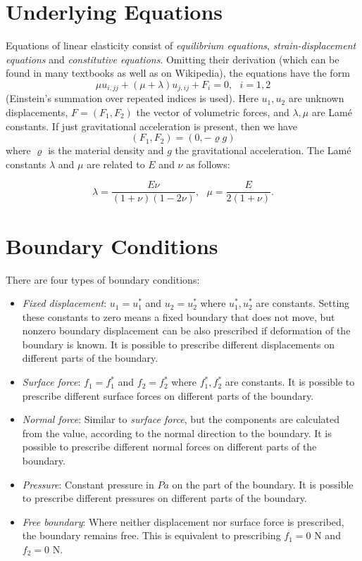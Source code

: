 \documentclass{article}
\begin{document}
\section{Underlying Equations}

Equations of linear elasticity consist of {\em equilibrium equations},
{\em strain-displacement equations} and {\em constitutive equations}.
Omitting their derivation (which can be found in many textbooks as well as 
on Wikipedia), the equations have the form 
$$
\mu u_{i, jj} + (\mu + \lambda) u_{j, ij} + F_i = 0, \ \ \ i = 1,2
$$
(Einstein's summation over repeated indices is used). 
Here $u_1, u_2$ are unknown displacements, $F = (F_1, F_2)$ the 
vector of volumetric forces, and $\lambda, \mu$ are Lam\'e constants.
If just gravitational acceleration is present, then we have 
$$
(F_1, F_2) = (0, -\varrho g)
$$
where $\varrho$ is the material density and $g$ the gravitational acceleration.
The Lam\'e constants $\lambda$
and $\mu$ are related to $E$ and $\nu$ as follows:

$$
\lambda = \frac{E \nu}{(1 + \nu)(1 - 2\nu)}, \ \ \ \mu = \frac{E}{2(1 + \nu)}.
$$

\section{Boundary Conditions}

There are four types of boundary conditions:
\begin{itemize}
\item {\em Fixed displacement}: $u_1 = u^*_1$ and $u_2 = u^*_2$ where $u^*_1, u^*_2$ are constants.
      Setting these constants to zero means a fixed boundary that does not move, but nonzero 
      boundary displacement can be also prescribed if deformation of the boundary is known. 
      It is possible to prescribe different displacements on different parts of 
      the boundary. 
\item {\em Surface force}: $f_1 = f^*_1$ and $f_2 = f^*_2$ where $f^*_1, f^*_2$ are constants.
      It is possible to prescribe different surface forces on different parts of 
      the boundary.
\item {\em Normal force}: Similar to {\em surface force}, but the components are calculated from the value, according to the normal direction to the boundary.
      It is possible to prescribe different normal forces on different parts of 
      the boundary.
\item {\em Pressure}: Constant pressure in $Pa$ on the part of the boundary.
      It is possible to prescribe different pressures on different parts of 
      the boundary.
\item {\em Free boundary}: Where neither displacement nor surface force is prescribed, the
      boundary remains free. This is equivalent to prescribing $f_1 = 0$ N and $f_2 = 0$ N.
\end{itemize}
\end{document}

